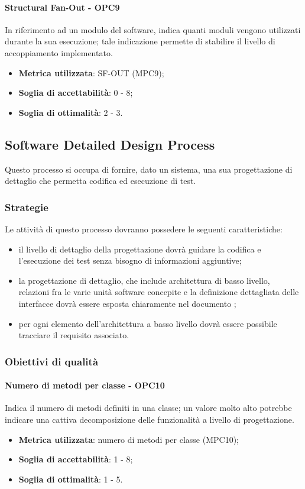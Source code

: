 \documentclass[PdQ.tex]{subfiles}
\begin{document}
			\paragraph{Structural Fan-Out - OPC9}
			In riferimento ad un modulo del software, indica quanti moduli vengono utilizzati durante la
			sua esecuzione; tale indicazione permette di stabilire il livello di accoppiamento implementato.
			\begin{itemize}
					\item \textbf{Metrica utilizzata}: SF-OUT (MPC9);
					\item \textbf{Soglia di accettabilità}: 0 - 8;
					\item \textbf{Soglia di ottimalità}: 2 - 3.
			\end{itemize}
			
	\subsection{Software Detailed Design Process}
		Questo processo si occupa di fornire, dato un sistema, una sua progettazione di dettaglio che permetta codifica ed esecuzione di test.	
	
		\subsubsection{Strategie}
			Le attività di questo processo dovranno possedere le seguenti caratteristiche:
			\begin{itemize}
			\item il livello di dettaglio della progettazione dovrà guidare la codifica e l'esecuzione dei test senza bisogno di informazioni aggiuntive;
			\item la progettazione di dettaglio, che include architettura di basso livello,  relazioni fra le varie unità software concepite e la definizione dettagliata delle interfacce dovrà essere esposta chiaramente nel documento \DPdoc{};
			\item per ogni elemento dell'architettura a basso livello dovrà essere possibile tracciare il requisito associato.
			\end{itemize}
		
		\subsubsection{Obiettivi di qualità}
			\paragraph{Numero di metodi per classe - OPC10}
			Indica il numero di metodi definiti in una classe; un valore molto alto potrebbe indicare una cattiva decomposizione delle funzionalità a livello di progettazione.
			\begin{itemize}
				\item \textbf{Metrica utilizzata}: numero di metodi per classe (MPC10);
				\item \textbf{Soglia di accettabilità}: 1 -  8;
				\item \textbf{Soglia di ottimalità}: 1 - 5.
			\end{itemize}
			
\end{document}
